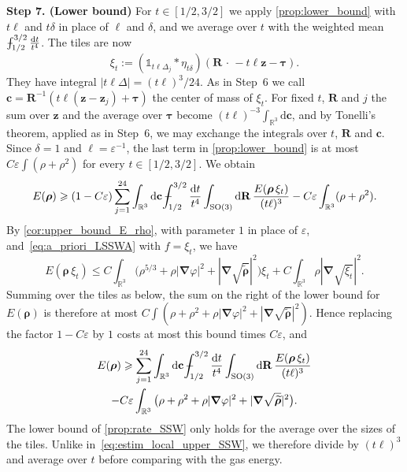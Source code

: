 \documentclass[final,reqno]{amsart}
\theoremstyle{remark}
\renewcommand{\le}{\leqslant}
\renewcommand{\ge}{\geqslant}
\renewcommand{\epsilon}{\varepsilon}
\newcommand{\wt}[1]{\widetilde{#1}}
\newcommand{\RR}{\mathbb{R}}
\newcommand{\SO}{\mathrm{SO}}
\newcommand{\iden}{\mathbb{1}}
\newcommand{\grad}{\bm{\nabla}}
\newcommand{\tetra}{\mathbb{\Delta}}
\newcommand{\dd}{\mathrm{d}}
\def\Xint#1{\mathchoice
{\XXint\displaystyle\textstyle{#1}}
{\XXint\textstyle\scriptstyle{#1}}
{\XXint\scriptstyle\scriptscriptstyle{#1}}
{\XXint\scriptscriptstyle\scriptscriptstyle{#1}}
\!\int}
\def\XXint#1#2#3{{\setbox0=\hbox{$#1{#2#3}{\int}$ }
\vcenter{\hbox{$#2#3$ }}\kern-.6\wd0}}
\def\dashint{\Xint-}
\begin{document}
\medskip

\noindent\textbf{Step 7. (Lower bound)} For $t\in[1/2,3/2]$ we apply \cref{prop:lower_bound} with $t\ell$ and $t\delta$ in place of $\ell$ and $\delta$, and we average over $t$ with the weighted mean $\dashint_{1/2}^{3/2}\frac{\dd t}{t^4}$. The tiles are now
$$
\xi_t:=(\iden_{t\ell\tetra_j}\ast\eta_{t\delta})(\mathbf{R}\,\cdot\,-t\ell\mathbf{z}-\bm{\tau}).
$$
They have integral $|t\ell\tetra|=(t\ell)^3/24$. As in Step~6 we call $\mathbf{c}=\mathbf{R}^{-1}(t\ell(\mathbf{z}-\mathbf{z}_j)+\bm{\tau})$ the center of mass of $\xi_t$. For fixed $t$, $\mathbf{R}$ and $j$ the sum over $\mathbf{z}$ and the average over $\bm{\tau}$ become $(t\ell)^{-3}\int_{\RR^3}\dd\mathbf{c}$, and by Tonelli's theorem, applied as in Step~6, we may exchange the integrals over $t$, $\mathbf{R}$ and $\mathbf{c}$. Since $\delta=1$ and $\ell=\epsilon^{-1}$, the last term in \cref{prop:lower_bound} is at most $C\epsilon\int(\rho+\rho^2)$ for every $t\in[1/2,3/2]$. We obtain
$$
E(\bm{\rho})\ge(1-C\epsilon)\sum_{j=1}^{24}\int_{\RR^3}\dd\mathbf{c}\,\dashint_{1/2}^{3/2}\frac{\dd t}{t^4}\int_{\SO(3)}\dd\mathbf{R}\,\frac{E(\bm{\rho}\,\xi_t)}{(t\ell)^3}-C\epsilon\int_{\RR^3}(\rho+\rho^2).
$$
By \cref{cor:upper_bound_E_rho}, with parameter $1$ in place of $\epsilon$, and~\cref{eq:a_priori_LSSWA} with $f=\xi_t$, we have
$$
E(\bm{\rho}\,\xi_t)\le C\int_{\RR^3}\big(\rho^{5/3}+\rho|\grad\varphi|^2+|\grad\sqrt{\wt{\bm{\rho}}}|^2\big)\xi_t+C\int_{\RR^3}\rho|\grad\sqrt{\xi_t}|^2 .
$$
Summing over the tiles as below, the sum on the right of the lower bound for $E(\bm{\rho})$ is therefore at most $C\int(\rho+\rho^2+\rho|\grad\varphi|^2+|\grad\sqrt{\wt{\bm{\rho}}}|^2)$. Hence replacing the factor $1-C\epsilon$ by $1$ costs at most this bound times $C\epsilon$, and
\begin{multline*}
E(\bm{\rho})\ge\sum_{j=1}^{24}\int_{\RR^3}\dd\mathbf{c}\,\dashint_{1/2}^{3/2}\frac{\dd t}{t^4}\int_{\SO(3)}\dd\mathbf{R}\,\frac{E(\bm{\rho}\,\xi_t)}{(t\ell)^3}\\
-C\epsilon\int_{\RR^3}\big(\rho+\rho^2+\rho|\grad\varphi|^2+|\grad\sqrt{\wt{\bm{\rho}}}|^2\big).
\end{multline*}
The lower bound of \cref{prop:rate_SSW} only holds for the average over the sizes of the tiles. Unlike in~\cref{eq:estim_local_upper_SSW}, we therefore divide by $(t\ell)^3$ and average over $t$ before comparing with the gas energy.
\end{document}

